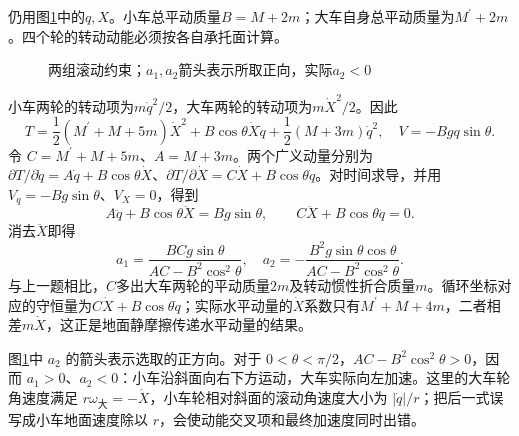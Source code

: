 \begin{solution}
仍用图\ref{fig:hw1-6-s}中的$q,X$。小车总平动质量$B=M+2m$；大车自身总平动质量为$M^\prime+2m$。四个轮的转动动能必须按各自承托面计算。

\begin{figure}[H]\centering
{}
\caption{两组滚动约束；$a_1,a_2$箭头表示所取正向，实际$a_2<0$}\label{fig:hw1-6-s}
\end{figure}

小车两轮的转动项为$m\dot q^2/2$，大车两轮的转动项为$m\dot X^2/2$。因此
\[
 T=\frac12(M^\prime+M+5m)\dot X^2
 +B\cos\theta\dot X\dot q+\frac12(M+3m)\dot q^2,
 \quad V=-Bgq\sin\theta.
\]
令 $C=M^\prime+M+5m$、$A=M+3m$。两个广义动量分别为 $\partial T/\partial\dot q=A\dot q+B\cos\theta\dot X$、$\partial T/\partial\dot X=C\dot X+B\cos\theta\dot q$。对时间求导，并用 $V_q=-Bg\sin\theta$、$V_X=0$，得到
\[
 A\ddot q+B\cos\theta\ddot X=Bg\sin\theta,
 \qquad C\ddot X+B\cos\theta\ddot q=0.
\]
消去$\ddot X$即得
\[
 \boxed{a_1=\frac{BCg\sin\theta}{AC-B^2\cos^2\theta},\quad
 a_2=-\frac{B^2g\sin\theta\cos\theta}{AC-B^2\cos^2\theta}}.
\]
与上一题相比，$C$多出大车两轮的平动质量$2m$及转动惯性折合质量$m$。循环坐标对应的守恒量为$C\dot X+B\cos\theta\dot q$；实际水平动量的$\dot X$系数只有$M^\prime+M+4m$，二者相差$m\dot X$，这正是地面静摩擦传递水平动量的结果。


图\ref{fig:hw1-6-s}中 $a_2$ 的箭头表示选取的正方向。对于 $0<\theta<\pi/2$，$AC-B^2\cos^2\theta>0$，因而 $a_1>0$、$a_2<0$：小车沿斜面向右下方运动，大车实际向左加速。这里的大车轮角速度满足 $r\omega_{\text{大}}=-\dot X$，小车轮相对斜面的滚动角速度大小为 $|\dot q|/r$；把后一式误写成小车地面速度除以 $r$，会使动能交叉项和最终加速度同时出错。

\end{solution}



